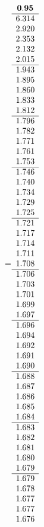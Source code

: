 =\hbox{$\begin{array}{c}
\bf 0.95 
 \\ \hline 
   6.314 \\ 
   2.920 \\ 
   2.353 \\ 
   2.132 \\ 
   2.015
 \\ \hline 
   1.943 \\ 
   1.895 \\ 
   1.860 \\ 
   1.833 \\ 
   1.812
 \\ \hline 
   1.796 \\ 
   1.782 \\ 
   1.771 \\ 
   1.761 \\ 
   1.753
 \\ \hline 
   1.746 \\ 
   1.740 \\ 
   1.734 \\ 
   1.729 \\ 
   1.725
 \\ \hline 
   1.721 \\ 
   1.717 \\ 
   1.714 \\ 
   1.711 \\ 
   1.708
 \\ \hline 
   1.706 \\ 
   1.703 \\ 
   1.701 \\ 
   1.699 \\ 
   1.697
 \\ \hline 
   1.696 \\ 
   1.694 \\ 
   1.692 \\ 
   1.691 \\ 
   1.690
 \\ \hline 
   1.688 \\ 
   1.687 \\ 
   1.686 \\ 
   1.685 \\ 
   1.684
 \\ \hline 
   1.683 \\ 
   1.682 \\ 
   1.681 \\ 
   1.680 \\ 
   1.679
 \\ \hline 
   1.679 \\ 
   1.678 \\ 
   1.677 \\ 
   1.677 \\ 
   1.676
 \end{array}$}
